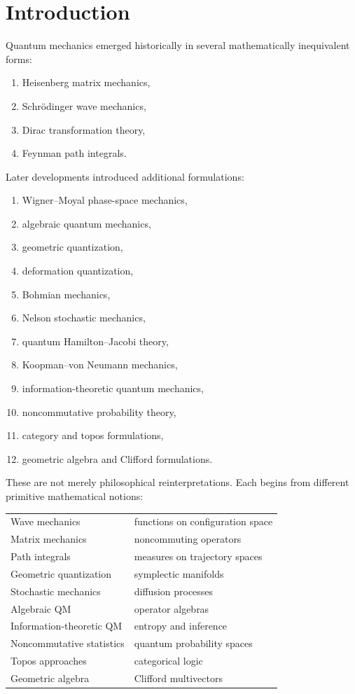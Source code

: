 \documentclass[11pt]{article}
\begin{document}
\tableofcontents

\section{Introduction}

Quantum mechanics emerged historically in several mathematically inequivalent forms:

\begin{enumerate}
\item Heisenberg matrix mechanics,
\item Schr\"odinger wave mechanics,
\item Dirac transformation theory,
\item Feynman path integrals.
\end{enumerate}

Later developments introduced additional formulations:

\begin{enumerate}[resume]
\item Wigner--Moyal phase-space mechanics,
\item algebraic quantum mechanics,
\item geometric quantization,
\item deformation quantization,
\item Bohmian mechanics,
\item Nelson stochastic mechanics,
\item quantum Hamilton--Jacobi theory,
\item Koopman--von Neumann mechanics,
\item information-theoretic quantum mechanics,
\item noncommutative probability theory,
\item category and topos formulations,
\item geometric algebra and Clifford formulations.
\end{enumerate}

These are not merely philosophical reinterpretations. Each begins from different primitive mathematical notions:

\begin{center}
\begin{tabular}{ll}
Wave mechanics & functions on configuration space \\
Matrix mechanics & noncommuting operators \\
Path integrals & measures on trajectory spaces \\
Geometric quantization & symplectic manifolds \\
Stochastic mechanics & diffusion processes \\
Algebraic QM & operator algebras \\
Information-theoretic QM & entropy and inference \\
Noncommutative statistics & quantum probability spaces \\
Topos approaches & categorical logic \\
Geometric algebra & Clifford multivectors
\end{tabular}
\end{center}
\end{document}
